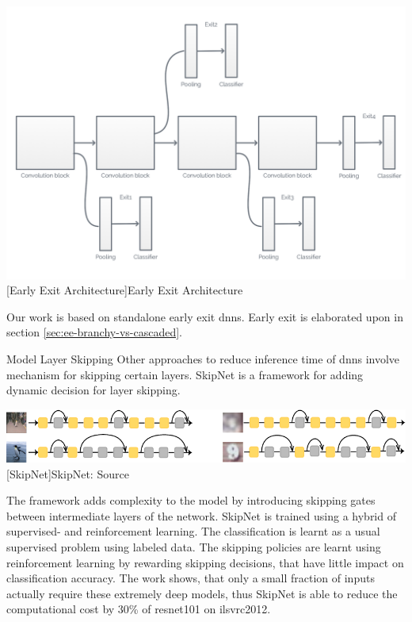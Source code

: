 \begin{enumdescript}
	\begin{minipage}[t]{\linewidth}    
		\centering                          
		\includegraphics[width=.7\linewidth]{figures/models/branchy}
		[Early Exit Architecture]{Early Exit Architecture}
		\label{fig:branchynet}
	\end{minipage}

	Our work is based on standalone early exit \gls{dnn}s. Early exit is elaborated upon in section \ref{sec:ee-branchy-vs-cascaded}.
	
	\item[Model Layer Skipping] Other approaches to reduce inference time of \gls{dnn}s involve mechanism for skipping certain layers. SkipNet \cite{wang_skipnet:_2017} is a framework for adding dynamic decision for layer skipping. 
	
	\begin{minipage}[t]{\linewidth}    
		\centering                          
		\includegraphics[width=.8\linewidth]{figures/models/skipnet}
		[SkipNet]{SkipNet: Source  \cite{wang_skipnet:_2017}}
	\end{minipage}
	
	The framework adds complexity to the model by introducing skipping gates between intermediate layers of the network. SkipNet is trained using a hybrid of supervised- and reinforcement learning. The classification is learnt as a usual supervised problem using labeled data. The skipping policies are learnt using reinforcement learning by rewarding skipping decisions, that have little impact on classification accuracy. The work shows, that only a small fraction of inputs actually require these extremely deep models, thus SkipNet is able to reduce the computational cost by 30\% of \gls{resnet}101 on \gls{ilsvrc2012}. 
	

\end{enumdescript}
